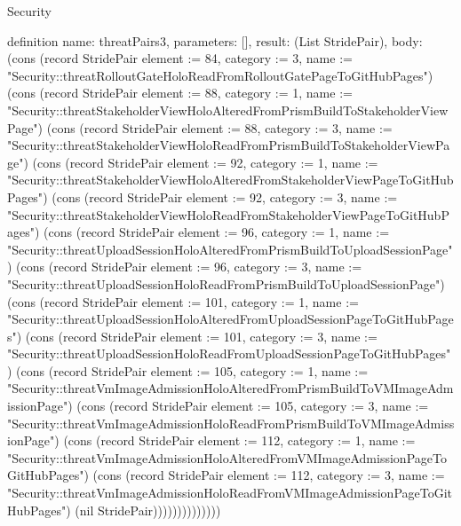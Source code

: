 \begin{lexlean}{Security}
\begin{semanticmodule}
definition{
  name: threatPairs3,
  parameters: [],
  result: (List StridePair),
  body: (cons (record StridePair {element := 84, category := 3, name := "Security::threatRolloutGateHoloReadFromRolloutGatePageToGitHubPages"}) (cons (record StridePair {element := 88, category := 1, name := "Security::threatStakeholderViewHoloAlteredFromPrismBuildToStakeholderViewPage"}) (cons (record StridePair {element := 88, category := 3, name := "Security::threatStakeholderViewHoloReadFromPrismBuildToStakeholderViewPage"}) (cons (record StridePair {element := 92, category := 1, name := "Security::threatStakeholderViewHoloAlteredFromStakeholderViewPageToGitHubPages"}) (cons (record StridePair {element := 92, category := 3, name := "Security::threatStakeholderViewHoloReadFromStakeholderViewPageToGitHubPages"}) (cons (record StridePair {element := 96, category := 1, name := "Security::threatUploadSessionHoloAlteredFromPrismBuildToUploadSessionPage"}) (cons (record StridePair {element := 96, category := 3, name := "Security::threatUploadSessionHoloReadFromPrismBuildToUploadSessionPage"}) (cons (record StridePair {element := 101, category := 1, name := "Security::threatUploadSessionHoloAlteredFromUploadSessionPageToGitHubPages"}) (cons (record StridePair {element := 101, category := 3, name := "Security::threatUploadSessionHoloReadFromUploadSessionPageToGitHubPages"}) (cons (record StridePair {element := 105, category := 1, name := "Security::threatVmImageAdmissionHoloAlteredFromPrismBuildToVMImageAdmissionPage"}) (cons (record StridePair {element := 105, category := 3, name := "Security::threatVmImageAdmissionHoloReadFromPrismBuildToVMImageAdmissionPage"}) (cons (record StridePair {element := 112, category := 1, name := "Security::threatVmImageAdmissionHoloAlteredFromVMImageAdmissionPageToGitHubPages"}) (cons (record StridePair {element := 112, category := 3, name := "Security::threatVmImageAdmissionHoloReadFromVMImageAdmissionPageToGitHubPages"}) (nil StridePair))))))))))))))
}


\end{semanticmodule}
\end{lexlean}
